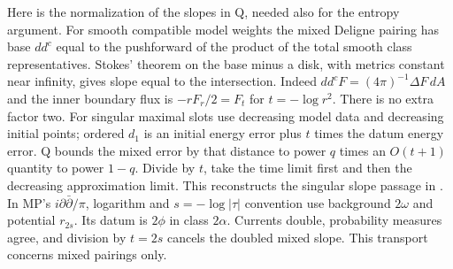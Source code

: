 \documentclass[11pt]{article}
\newcommand{\ddc}{dd^c}
\theoremstyle{remark}\newtheorem{remark}[theorem]{Remark}
\begin{document}
Here is the normalization of the slopes in Q, needed also for the
entropy argument. For smooth compatible model weights the mixed
Deligne pairing has base $\ddc$ equal to the pushforward of the product
of the total smooth class representatives. Stokes' theorem on the
base minus a disk, with metrics constant near infinity, gives slope
equal to the intersection. Indeed $\ddc F=(4\pi)^{-1}\Delta F\,dA$
and the inner boundary flux is $-rF_r/2=F_t$ for
$t=-\log r^2$. There is no extra factor two. For singular maximal
slots use decreasing model data and decreasing initial points;
ordered $d_1$ is an initial energy error plus $t$ times the datum
energy error. Q bounds the mixed error by that distance to power
$q$ times an $O(t+1)$ quantity to power $1-q$. Divide by $t$,
take the time limit first and then the decreasing approximation
limit. This reconstructs the singular slope passage in \cite{MP}.
In MP's $i\partial\bar\partial/\pi$, logarithm and
$s=-\log|\tau|$ convention use background $2\omega$ and potential
$r_{2s}$. Its datum is $2\phi$ in class $2\alpha$. Currents double,
probability measures agree, and division by $t=2s$ cancels the
doubled mixed slope. This transport concerns mixed pairings only.
\end{document}
